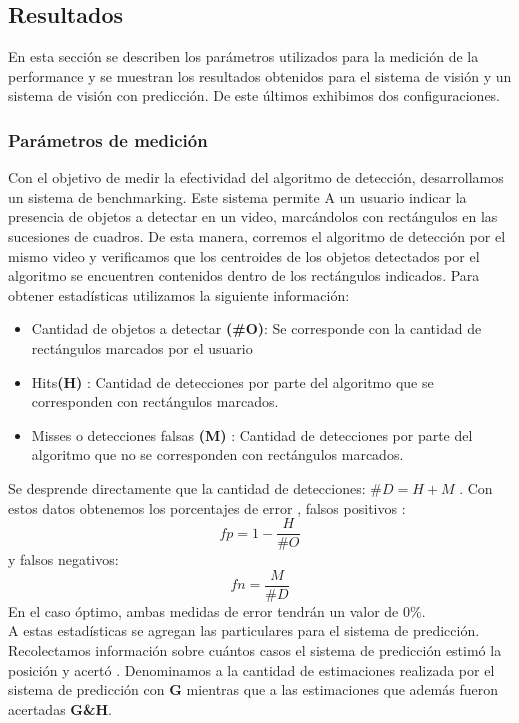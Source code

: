 	
	
\subsection{Resultados}
En esta sección se describen los parámetros utilizados para la 
medición de la performance y se muestran los resultados obtenidos para 
el sistema de visión y un sistema de visión con predicción. De este 
últimos exhibimos dos configuraciones.

\subsubsection{Parámetros de medición}
Con el objetivo de  medir la efectividad del algoritmo de detección, desarrollamos un sistema de benchmarking. Este sistema permite
A un usuario indicar la presencia de objetos a detectar en un video, marcándolos con rectángulos en las sucesiones de cuadros. De esta
manera, corremos el algoritmo de detección por el mismo video y verificamos que los centroides de los objetos detectados por el algoritmo 
se encuentren contenidos dentro de los rectángulos indicados.  Para obtener estadísticas utilizamos la siguiente información:
\begin{itemize}
\item { Cantidad de objetos a detectar \textbf{(\#O)}: Se corresponde con la cantidad de rectángulos marcados por el usuario}
\item { Hits\textbf{(H)} : Cantidad de detecciones por parte del algoritmo que se corresponden con rectángulos marcados.}
\item { Misses o detecciones falsas \textbf{(M)} : Cantidad de detecciones por parte del algoritmo que no se corresponden con rectángulos marcados.}
\end{itemize}
Se desprende directamente que la cantidad de detecciones: 
\textbf{$\#D=H+M$} .
Con estos datos obtenemos los porcentajes de error , falsos positivos : 
\[
	fp=1 - \frac{H}{\# O}
\]
y falsos negativos:
\[
	fn=\frac{M}{\# D}
\]
En el caso óptimo, ambas medidas de error tendrán un valor de $0\%$.  \\
\indent A estas estadísticas se agregan las particulares para el sistema de predicción. Recolectamos información sobre
cuántos casos el sistema de predicción estimó la posición y acertó . Denominamos
a la cantidad de estimaciones realizada por el sistema de predicción 
con \textbf{G} mientras que a las estimaciones que además fueron 
acertadas \textbf{G\&H}.

